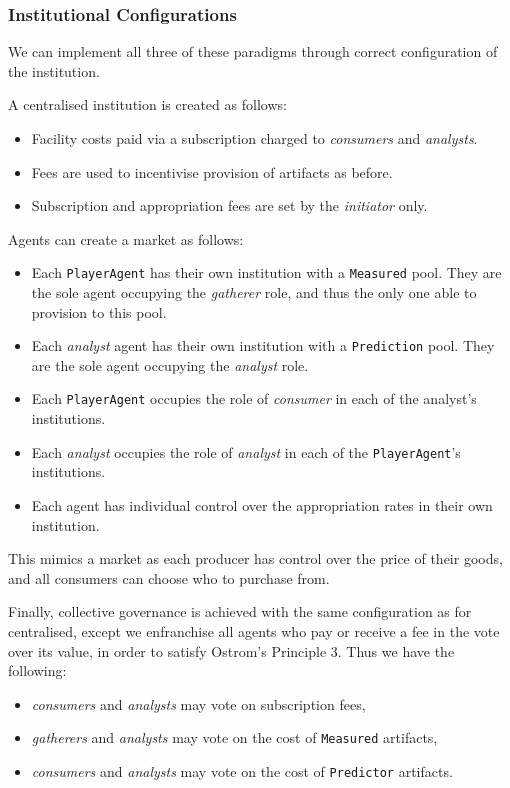 \subsubsection*{Institutional Configurations}

We can implement all three of these paradigms through correct configuration of the institution. 

A centralised institution is created as follows:

\begin{itemize}
\item Facility costs paid via a subscription charged to \emph{consumers} and \emph{analysts}.
\item Fees are used to incentivise provision of artifacts as before.
\item Subscription and appropriation fees are set by the \emph{initiator} only.
\end{itemize}

Agents can create a market as follows:

\begin{itemize}
\item Each \texttt{PlayerAgent} has their own institution with a \texttt{Measured} pool. They are the sole agent occupying the \emph{gatherer} role, and thus the only one able to provision to this pool.
\item Each \emph{analyst} agent has their own institution with a \texttt{Prediction} pool. They are the sole agent occupying the \emph{analyst} role.
\item Each \texttt{PlayerAgent} occupies the role of \emph{consumer} in each of the analyst's institutions.
\item Each \emph{analyst} occupies the role of \emph{analyst} in each of the \texttt{PlayerAgent}'s institutions.
\item Each agent has individual control over the appropriation rates in their own institution.
\end{itemize}

This mimics a market as each producer has control over the price of their goods, and all consumers can choose who to purchase from.

Finally, collective governance is achieved with the same configuration as for centralised, except we enfranchise all agents who pay or receive a fee in the vote over its value, in order to satisfy Ostrom's Principle 3. Thus we have the following:

\begin{itemize}
\item \emph{consumers} and \emph{analysts} may vote on subscription fees,
\item \emph{gatherers} and \emph{analysts} may vote on the cost of \texttt{Measured} artifacts,
\item \emph{consumers} and \emph{analysts} may vote on the cost of \texttt{Predictor} artifacts.
\end{itemize}

